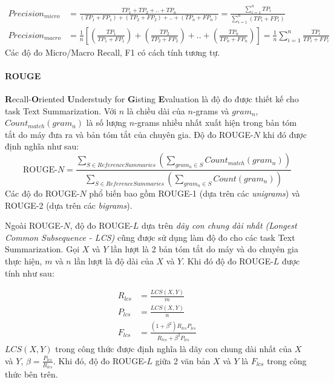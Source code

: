 \begin{equation}
\begin{aligned}
Precision_{micro} &= \frac{TP_1 + TP_2 + .. + TP_n}{(TP_1 + FP_1) + (TP_2 + FP_2) + .. + (TP_n + FP_n)} = \frac{\displaystyle\sum_{i = 1}^n TP_i}{\displaystyle\sum_{i = 1}^n (TP_i + FP_i)} \\
Precision_{macro} &= \frac{1}{n}\left[\left(\frac{TP_1}{TP_1 + FP_1}\right) + \left(\frac{TP_2}{TP_2 + FP_2}\right) + .. + \left(\frac{TP_n}{TP_n + FP_n}\right)\right] = \frac{1}{n}\sum_{i = 1}^n \frac{TP_i}{TP_i + FP_i}
\end{aligned}
\end{equation}
Các độ đo Micro/Macro Recall, F1 có cách tính tương tự.

\paragraph{ROUGE}
\textbf{R}ecall-\textbf{O}riented \textbf{U}nderstudy for \textbf{G}isting \textbf{E}valuation\cite{lin-2004-rouge} là độ đo được thiết kế cho task Text Summarization. Với $n$ là chiều dài của $n$-grams và $gram_n$, $Count_{match}(gram_n)$ là số lượng $n$-grams nhiều nhất xuất hiện trong bản tóm tắt do máy đưa ra và bản tóm tắt của chuyên gia. Độ đo ROUGE-$N$ khi đó được định nghĩa như sau:
\begin{equation}
\text{ROUGE-}N = \frac{\displaystyle\sum_{S \in {ReferenceSummaries}}\left(\sum_{gram_n \in S}Count_{match}(gram_n)\right)}{\displaystyle\sum_{S \in {ReferenceSummaries}}\left(\sum_{gram_n \in S}Count(gram_n)\right)}
\end{equation}
Các độ đo ROUGE-$N$ phổ biến bao gồm ROUGE-1 (dựa trên các \textit{unigrams}) và ROUGE-2 (dựa trên các \textit{bigrams}). 

Ngoài ROUGE-$N$, độ đo ROUGE-$L$ dựa trên \textit{dãy con chung dài nhất (Longest Common Subsequence - LCS)} cũng được sử dụng làm độ đo cho các task Text Summarization. Gọi $X$ và $Y$ lần lượt là 2 bản tóm tắt do máy và do chuyên gia thực hiện, $m$ và $n$ lần lượt là độ dài của $X$ và $Y$. Khi đó độ đo ROUGE-$L$ được tính như sau:

\begin{equation}
\begin{aligned}
R_{lcs} &= \frac{LCS(X, Y)}{m} \\
P_{lcs} &= \frac{LCS(X, Y)}{n} \\
F_{lcs} &= \frac{(1 + \beta^2)R_{lcs}P_{lcs}}{R_{lcs} + \beta^2P_{lcs}}
\end{aligned}
\end{equation}
$LCS(X, Y)$ trong công thức được định nghĩa là dãy con chung dài nhất của $X$ và $Y$, $\displaystyle \beta = \frac{P_{lcs}}{R_{lcs}}$. Khi đó, độ đo ROUGE-$L$ giữa 2 văn bản $X$ và $Y$ là $F_{lcs}$ trong công thức bên trên.

